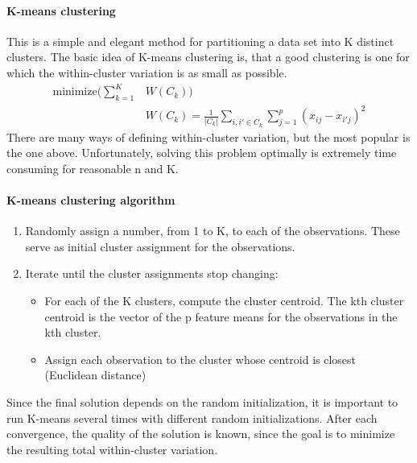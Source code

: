 \documentclass[../document.tex]{subfiles}
\begin{document}
	\paragraph{K-means clustering}
	This is a simple and elegant method for partitioning a data set into K distinct clusters. The basic idea of K-means clustering is, that a good clustering is one for which the within-cluster variation is as small as possible.
	\begin{equation}
	\begin{split}
		\text{minimize}(\sum_{k=1}^{K}&W(C_{k}))\\
		&W(C_{k})=\frac{1}{|C_{k}|}\sum_{i,i'\in C_{k}}\sum_{j=1}^{p}(x_{ij}-x_{i'j})^2
	\end{split}
	\end{equation}
	There are many ways of defining within-cluster variation, but the most popular is the one above. Unfortunately, solving this problem optimally is extremely time consuming for reasonable n and K.
	\paragraph{K-means clustering algorithm}
	\begin{enumerate}
		\item Randomly assign a number, from 1 to K, to each of the observations. These serve as initial cluster assignment for the observations.
		\item Iterate until the cluster assignments stop changing:
		\begin{itemize}
			\item For each of the K clusters, compute the cluster centroid. The kth cluster centroid is the vector of the p feature means for the observations in the kth cluster.
			\item Assign each observation to the cluster whose centroid is closest (Euclidean distance)
		\end{itemize}
	\end{enumerate}
	Since the final solution depends on the random initialization, it is important to run K-means several times with different random initializations. After each convergence, the quality of the solution is known, since the goal is to minimize the resulting total within-cluster variation.
\end{document}
